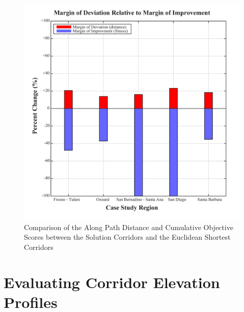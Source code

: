     \begin{figure}[!h]
        \begin{center}
        \includegraphics[width=5.5in]{figures/Margin_Improvement.png}
        \caption{Comparison of the Along Path Distance and Cumulative Objective Scores between the Solution Corridors and the Euclidean Shortest Corridors}
        \label{fig:MarginImprovement}
        \end{center}
    \end{figure}
    
\section{Evaluating Corridor Elevation Profiles}

